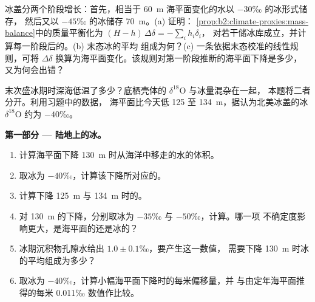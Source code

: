 \begin{exercise}[$\star\star\star$]\label{exo:b2:climate-proxies:12}
冰盖分两个阶段增长：首先，相当于 \qty{60}{m} 海平面变化的水以 $-30$‰ 的冰形式储存，
然后又以 $-45$‰ 的冰储存 \qty{70}{m}。(a) 证明：
\cref{prop:b2:climate-proxies:mass-balance}中的质量平衡化为 $(H - h)\,\Delta\delta = -\sum_i h_i\delta_i$，
对若干储冰库成立，并计算每一阶段后的。(b) 末态冰的平均
组成为何？(c) 一条依据末态校准的线性规则，可将
$\Delta\delta$ 换算为海平面变化。该规则对第一阶段推断的海平面下降是多少，
又为何会出错？
\end{exercise}

\begin{problem}\label{pb:b2:climate-proxies:1}
末次盛冰期时深海低温了多少？底栖壳体的 $\delta^{18}$O 与冰量混杂在一起，
本题将二者分开。利用习题中的数据，
海平面比今天低 125 至 \qty{134}{m}，据认为北美冰盖的冰
$\delta^{18}$O 约为 $-40$‰。

\medskip\noindent\textbf{第一部分 --- 陆地上的冰。}
\begin{enumerate}
  \item 计算海平面下降 \qty{130}{m} 时从海洋中移走的水的体积。
  \item 取冰为 $-40$‰，计算该下降所对应的。
  \item 计算下降 \qty{125}{m} 与 \qty{134}{m} 时的。
  \item 对 \qty{130}{m} 的下降，分别取冰为 $-35$‰ 与 $-50$‰，计算。哪一项
        不确定度影响更大，是海平面的还是冰的？
  \item 冰期沉积物孔隙水给出 $1.0 \pm 0.1$‰，要产生这一数值，
        需要下降 \qty{130}{m} 时冰的平均组成为多少？
  \item 取冰为 $-40$‰，计算小幅海平面下降时的每米偏移量，并
        与由定年海平面推得的每米 \num{0.011}‰ 数值作比较。
\end{enumerate}


\end{problem}
